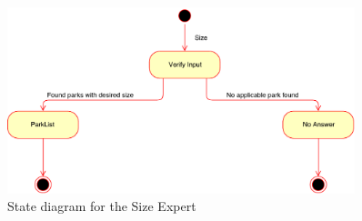 \documentclass[titlepage,12pt]{article}
\begin{document}
\begin{figure}[H]
    \centerline{\includegraphics[width=0.90\textwidth]{state_diagrams/Size_Expert}}
    \caption{State diagram for the Size Expert}
    \label{fig:size_expert}
\end{figure}
\end{document}
